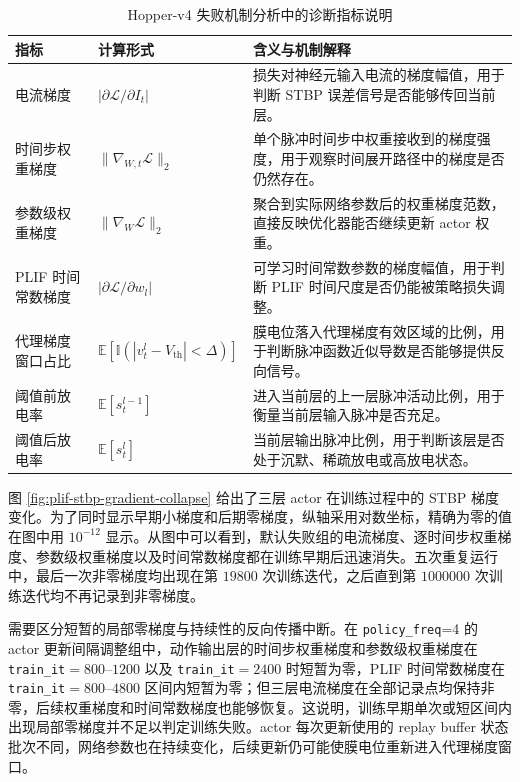 \documentclass[UTF8,zihao=-4,oneside,openany]{ctexbook}
\begin{document}
\begin{table}[H]
\centering
\caption{Hopper-v4 失败机制分析中的诊断指标说明}
\label{tab:stbp-diagnostic-metrics}
\setlength{\tabcolsep}{3pt}
\begin{tabular}{p{}p{}p{}}
\toprule
\textbf{指标} & \textbf{计算形式} & \textbf{含义与机制解释} \\
\midrule
电流梯度 & $\left|\partial\mathcal{L}/\partial I_t\right|$ & 损失对神经元输入电流的梯度幅值，用于判断 STBP 误差信号是否能够传回当前层。 \\
时间步权重梯度 & $\|\nabla_{W,t}\mathcal{L}\|_2$ & 单个脉冲时间步中权重接收到的梯度强度，用于观察时间展开路径中的梯度是否仍然存在。 \\
参数级权重梯度 & $\|\nabla_W\mathcal{L}\|_2$ & 聚合到实际网络参数后的权重梯度范数，直接反映优化器能否继续更新 actor 权重。 \\
PLIF 时间常数梯度 & $\left|\partial\mathcal{L}/\partial w_l\right|$ & 可学习时间常数参数的梯度幅值，用于判断 PLIF 时间尺度是否仍能被策略损失调整。 \\
代理梯度窗口占比 & $\mathbb{E}[\mathbb{I}(|v_t^l-V_{\mathrm{th}}|<\Delta)]$ & 膜电位落入代理梯度有效区域的比例，用于判断脉冲函数近似导数是否能够提供反向信号。 \\
阈值前放电率 & $\mathbb{E}[s_t^{l-1}]$ & 进入当前层的上一层脉冲活动比例，用于衡量当前层输入脉冲是否充足。 \\
阈值后放电率 & $\mathbb{E}[s_t^l]$ & 当前层输出脉冲比例，用于判断该层是否处于沉默、稀疏放电或高放电状态。 \\
\bottomrule
\end{tabular}
\end{table}

图 \ref{fig:plif-stbp-gradient-collapse} 给出了三层 actor 在训练过程中的 STBP 梯度变化。为了同时显示早期小梯度和后期零梯度，纵轴采用对数坐标，精确为零的值在图中用 $10^{-12}$ 显示。从图中可以看到，默认失败组的电流梯度、逐时间步权重梯度、参数级权重梯度以及时间常数梯度都在训练早期后迅速消失。五次重复运行中，最后一次非零梯度均出现在第 $19800$ 次训练迭代，之后直到第 $1000000$ 次训练迭代均不再记录到非零梯度。

需要区分短暂的局部零梯度与持续性的反向传播中断。在 \texttt{policy\_freq}=4 的 actor 更新间隔调整组中，动作输出层的时间步权重梯度和参数级权重梯度在 \texttt{train\_it}$=800$--$1200$ 以及 \texttt{train\_it}$=2400$ 时短暂为零，PLIF 时间常数梯度在 \texttt{train\_it}$=800$--$4800$ 区间内短暂为零；但三层电流梯度在全部记录点均保持非零，后续权重梯度和时间常数梯度也能够恢复。这说明，训练早期单次或短区间内出现局部零梯度并不足以判定训练失败。actor 每次更新使用的 replay buffer 状态批次不同，网络参数也在持续变化，后续更新仍可能使膜电位重新进入代理梯度窗口。
\end{document}
